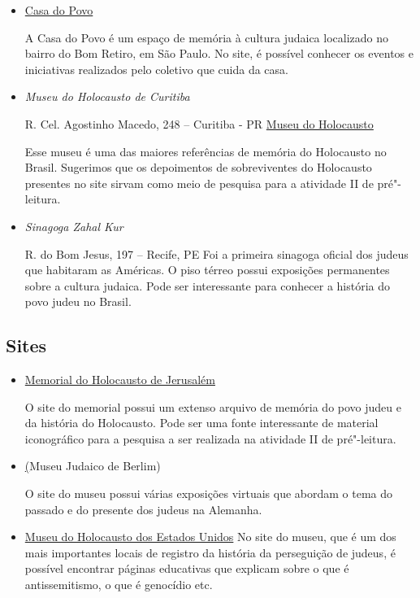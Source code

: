 \documentclass[12pt]{extarticle}
\begin{document}
\begin{itemize}

\item \href{https://casadopovo.org.br/}{Casa do Povo}

A Casa do Povo é um espaço de memória à cultura judaica localizado no
bairro do Bom Retiro, em São Paulo. No site, é possível conhecer
os eventos e iniciativas realizados pelo coletivo que cuida da casa.


\item\textit{Museu do Holocausto de Curitiba}

R. Cel. Agostinho Macedo, 248 -- Curitiba - PR
\href{https://www.museudoholocausto.org.br/}{Museu do Holocausto}

Esse museu é uma das maiores referências de memória do Holocausto no Brasil.
Sugerimos que os depoimentos de sobreviventes do Holocausto presentes no site
sirvam como meio de pesquisa para a atividade II de pré"-leitura.

\item \textit{Sinagoga Zahal Kur}

R. do Bom Jesus, 197 -- Recife, PE
Foi a primeira sinagoga oficial dos judeus que habitaram as Américas. O piso térreo possui exposições permanentes sobre a cultura judaica. Pode ser interessante para conhecer a história do povo judeu no Brasil.


\end{itemize}


\subsection{Sites}


\begin{itemize}


\item \href{https://www.yadvashem.org/}{Memorial do Holocausto de Jerusalém}

O site do memorial possui um extenso arquivo de memória do povo judeu
e da história do Holocausto. Pode ser uma fonte interessante de material 
iconográfico para a pesquisa a ser realizada na
atividade II de pré"-leitura.

\item \href{https://www.jmberlin.de/en}(Museu Judaico de Berlim)

O site do museu possui várias exposições virtuais que abordam o tema
do passado e do presente dos judeus na Alemanha.

\item \href{https://www.ushmm.org/}{Museu do Holocausto dos Estados Unidos}
No site do museu, que é um dos mais importantes locais de registro da história
da perseguição de judeus, é possível encontrar páginas educativas
que explicam sobre o que é antissemitismo, o que é genocídio etc.

\end{itemize}
\end{document}
